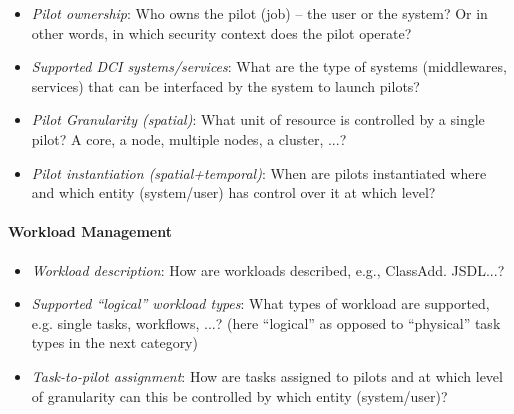 \documentclass{sig-alternate}
\begin{document}
\begin{itemize}

  \item \textit{Pilot ownership}: Who owns the pilot (job) -- the user or the \pilotjob system? Or in other
    words, in which security context does the pilot operate?   

  \item \textit{Supported DCI systems/services}: What are the type of systems (middlewares, services) 
    that can be interfaced by the \pilotjob system to launch pilots? 

  \item \textit{Pilot Granularity (spatial)}: What unit of resource is controlled by a single pilot? 
    A core, a node, multiple nodes, a cluster, ...? 

  \item \textit{Pilot instantiation (spatial+temporal)}: When are pilots instantiated where and which entity (system/user) 
    has control over it at which level? 

\end{itemize}


\paragraph{Workload Management}

\begin{itemize}

  \item \textit{Workload description}: How are workloads described, e.g., ClassAdd. JSDL...?

  \item \textit{Supported ``logical'' workload types}: What types of workload are supported, e.g. 
    single tasks, workflows, ...? (here ``logical'' as opposed to ``physical'' task types in the next category)

  \item \textit{Task-to-pilot assignment}: How are tasks assigned to pilots and at which level of
    granularity can this be controlled by which entity (system/user)? 


\end{itemize}
\end{document}
